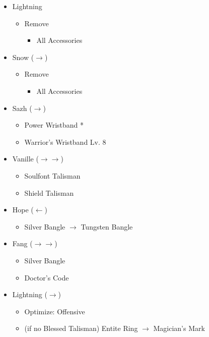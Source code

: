 		\vfill
	\begin{menu}
		\begin{itemize}
			\equip
			\begin{itemize}
				\item Lightning
				      \begin{itemize}
					      \item Remove
					            \begin{itemize}
						            \item All Accessories
					            \end{itemize}
				      \end{itemize}
				\item Snow ($\rightarrow$)
				      \begin{itemize}
					      \item Remove
					            \begin{itemize}
						            \item All Accessories
					            \end{itemize}
				      \end{itemize}
				\item Sazh ($\rightarrow$)
				      \begin{itemize}
					      \item Power Wristband *
					      \item Warrior's Wristband Lv. 8
				      \end{itemize}
				\item Vanille ($\rightarrow\rightarrow$)
				      \begin{itemize}
					      \item Soulfont Talisman
					      \item Shield Talisman
				      \end{itemize}
				\item Hope ($\leftarrow$)
				      \begin{itemize}
					      \item Silver Bangle $\rightarrow$ Tungsten Bangle
				      \end{itemize}
				\item Fang ($\rightarrow\rightarrow$)
				      \begin{itemize}
					      \item Silver Bangle
					      \item Doctor's Code
				      \end{itemize}
				\item Lightning ($\rightarrow$)
				      \begin{itemize}
					      \item Optimize: Offensive
					      \item (if no Blessed Talisman) Entite Ring $\rightarrow$ Magician's Mark
				      \end{itemize}
			\end{itemize}
		\end{itemize}
	\end{menu}
